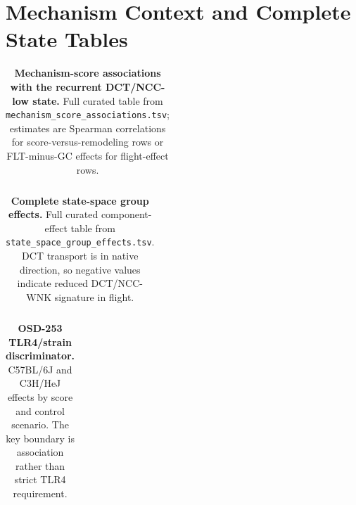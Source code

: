 \documentclass[10pt]{article}
\begin{document}
\section{Mechanism Context and Complete State Tables}

\begin{table}[H]
\centering\scriptsize
\caption{\textbf{Mechanism convergence summary.} Mechanisms are classified as outcome anchors, candidate upstream axes, or candidate context signatures. Association q-values are from score-versus-remodeling tests; gene-priority q-values summarize whether network-ranked genes enrich for the mechanism set.}
\label{tab:mechconv}
\end{table}

\begin{landscape}
\begingroup
\scriptsize
\setlength{\tabcolsep}{2pt}
\begin{longtable}{llllrrr}
\caption{\textbf{Mechanism-score associations with the recurrent DCT/NCC-low state.} Full curated table from \texttt{mechanism\_score\_associations.tsv}; estimates are Spearman correlations for score-versus-remodeling rows or FLT-minus-GC effects for flight-effect rows.}\label{tab:mechassoc}\\
\toprule
%
\end{longtable}
\endgroup
\end{landscape}

\begin{landscape}
\begingroup
\scriptsize
\setlength{\tabcolsep}{2pt}
\begin{longtable}{lllllllrrr}
\caption{\textbf{Complete state-space group effects.} Full curated component-effect table from \texttt{state\_space\_group\_effects.tsv}. DCT transport is in native direction, so negative values indicate reduced DCT/NCC-WNK signature in flight.}\label{tab:statefull}\\
\toprule
%
\end{longtable}
\endgroup
\end{landscape}

\begin{landscape}
\begingroup
\scriptsize
\setlength{\tabcolsep}{2pt}
\begin{longtable}{llrrrrrrl}
\caption{\textbf{OSD-253 TLR4/strain discriminator.} C57BL/6J and C3H/HeJ effects by score and control scenario. The key boundary is association rather than strict TLR4 requirement.}\label{tab:tlr4disc}\\
\toprule
%
\end{longtable}
\endgroup
\end{landscape}
\end{document}
